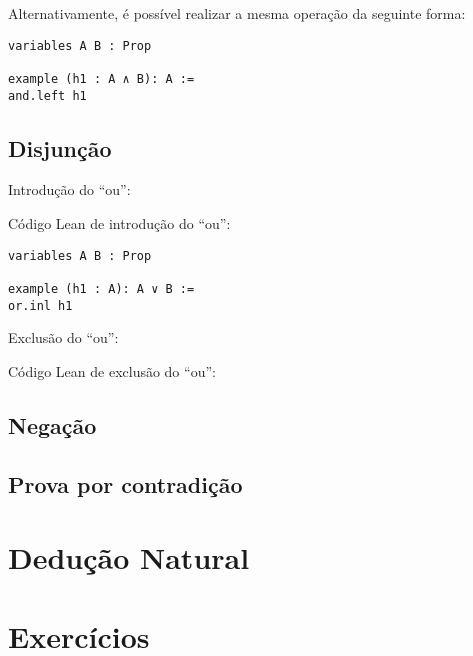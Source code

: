 Alternativamente, é possível realizar a mesma operação da seguinte forma: 
\begin{lstlisting} 
variables A B : Prop

example (h1 : A ∧ B): A :=
and.left h1
\end{lstlisting}
\subsection{Disjunção}

Introdução do ``ou'':
\begin{prooftree}
\end{prooftree}

Código Lean de introdução do ``ou'':
\begin{lstlisting} 
variables A B : Prop

example (h1 : A): A ∨ B :=
or.inl h1
\end{lstlisting} 

Exclusão do ``ou'': 

  \begin{prooftree}
     \end{prooftree}
     
Código Lean de exclusão do ``ou'':


\subsection{Negação}
\subsection{Prova por contradição}

\section{Dedução Natural}

\section{Exercícios}
